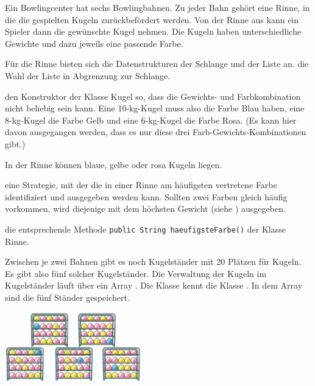 \documentclass[10pt, a4paper, ngerman]{arbeitsblatt}
\begin{document}
\begin{aufgabe}
Ein Bowlingcenter hat sechs Bowlingbahnen. Zu jeder Bahn gehört eine Rinne, in die die gespielten Kugeln zurückbefördert werden. Von der Rinne aus kann ein Spieler dann die gewünschte Kugel nehmen. Die Kugeln haben unterschiedliche Gewichte und dazu jeweils eine passende Farbe.

\begin{enuma}
	\item Für die Rinne bieten sich die Datenstrukturen der Schlange und der Liste an.  die Wahl der Liste in Abgrenzung zur Schlange.

	\item\label{taufg:bowling-sorten}  den Konstruktor der Klasse Kugel so, dass die Gewichts- und Farbkombination nicht beliebig sein kann. Eine 10-kg-Kugel muss also die Farbe Blau haben, eine 8-kg-Kugel die Farbe Gelb und eine 6-kg-Kugel die Farbe Rosa. (Es kann hier davon ausgegangen werden, dass es nur diese drei Farb-Gewichts-Kombinationen gibt.)

	\item In der Rinne können blaue, gelbe oder rosa Kugeln liegen.

	 eine Strategie, mit der die in einer Rinne am häufigsten vertretene Farbe identifiziert und ausgegeben werden kann. Sollten zwei Farben gleich häufig vorkommen, wird diejenige mit dem höchsten Gewicht (siehe ) ausgegeben.

	 die entsprechende Methode \texttt{public String haeufigsteFarbe()} der Klasse Rinne.

	\item
	Zwischen je zwei Bahnen gibt es noch Kugelständer mit 20 Plätzen für Kugeln. Es gibt also fünf solcher Kugelständer. Die Verwaltung der Kugeln im Kugelständer läuft über ein Array . Die Klasse  kennt die Klasse . In dem Array  sind die fünf Ständer gespeichert.

	\begin{center}
		\includegraphics[width=6cm]{Q1-AB.II.09-Abb_Bowlingstaender.png}
	\end{center}


\end{enuma}
\end{aufgabe}
\end{document}
